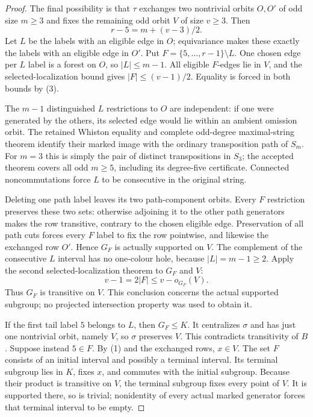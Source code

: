 \documentclass[11pt,a4paper]{article}
\begin{document}
\begin{proof}
The final possibility is that $\tau$ exchanges two nontrivial
orbits $O,O'$ of odd size $m\ge3$ and fixes the remaining odd orbit
$V$ of size $v\ge3$. Then
\[
                         r-5=m+(v-3)/2.                \tag{3}
\]
Let $L$ be the labels with an eligible edge in $O$; equivariance
makes these exactly the labels with an eligible edge in $O'$.
Put $F=\{5,\ldots,r-1\}\setminus L$.
One chosen edge per $L$ label is a forest on $O$, so $|L|\le m-1$.
All eligible $F$-edges lie in $V$, and the selected-localization
bound gives $|F|\le(v-1)/2$. Equality is forced in both bounds
by (3).

The $m-1$ distinguished $L$ restrictions to $O$ are independent:
if one were generated by the others, its selected edge would lie
within an ambient omission orbit. The retained Whiston equality
and complete odd-degree maximal-string theorem identify their
marked image with the ordinary transposition path of $S_m$.
For $m=3$ this is simply the pair of distinct transpositions in
$S_3$; the accepted theorem covers all odd $m\ge5$, including
its degree-five certificate. Connected noncommutations force $L$
to be consecutive in the original string.

Deleting one path label leaves its two path-component orbits.
Every $F$ restriction preserves these two sets: otherwise adjoining
it to the other path generators makes the row transitive, contrary
to the chosen eligible edge. Preservation of all path cuts forces
every $F$ label to fix the row pointwise, and likewise the exchanged
row $O'$. Hence $G_F$ is actually supported on $V$.
The complement of the consecutive $L$ interval has no one-colour
hole, because $|L|=m-1\ge2$.
Apply the second selected-localization theorem to $G_F$ and $V$:
\[
                   v-1=2|F|\le v-o_{G_F}(V).
\]
Thus $G_F$ is transitive on $V$. This conclusion concerns the
actual supported subgroup; no projected intersection property was
used to obtain it.

If the first tail label $5$ belongs to $L$, then $G_F\le K$.
It centralizes $\sigma$ and has just one nontrivial orbit, namely
$V$, so $\sigma$ preserves $V$. This contradicts transitivity of
$B$. Suppose instead $5\in F$. By (1) and the exchanged rows,
$x\in V$. The set $F$ consists of an initial interval and possibly
a terminal interval. Its terminal subgroup lies in $K$, fixes $x$,
and commutes with the initial subgroup. Because their product is
transitive on $V$, the terminal subgroup fixes every point of $V$.
It is supported there, so is trivial; nonidentity of every actual
marked generator forces that terminal interval to be empty.


\end{proof}
\end{document}
